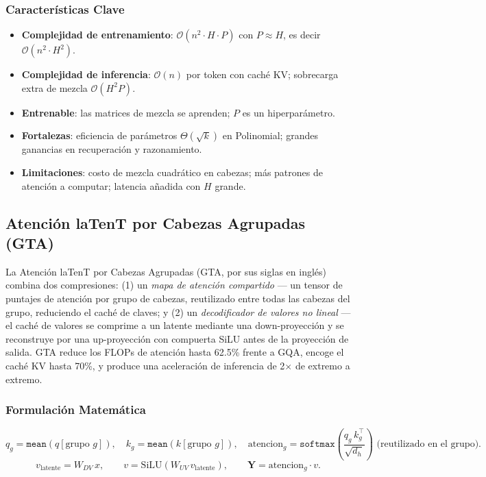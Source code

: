 \subsubsection{Características Clave}
\begin{itemize}[leftmargin=*]
    \item \textbf{Complejidad de entrenamiento}: $\mathcal{O}(n^2 \cdot H \cdot P)$ con $P \approx H$, es decir $\mathcal{O}(n^2 \cdot H^2)$.
    \item \textbf{Complejidad de inferencia}: $\mathcal{O}(n)$ por token con caché KV; sobrecarga extra de mezcla $\mathcal{O}(H^2 P)$.
    \item \textbf{Entrenable}: las matrices de mezcla se aprenden; $P$ es un hiperparámetro.
    \item \textbf{Fortalezas}: eficiencia de parámetros $\Theta(\sqrt{k})$ en Polinomial; grandes ganancias en recuperación y razonamiento.
    \item \textbf{Limitaciones}: costo de mezcla cuadrático en cabezas; más patrones de atención a computar; latencia añadida con $H$ grande.
\end{itemize}

\subsection{Atención laTenT por Cabezas Agrupadas (GTA)}
La Atención laTenT por Cabezas Agrupadas (GTA, por sus siglas en inglés) \citep{sun_gta_2025} combina dos compresiones: (1) un \emph{mapa de atención compartido} --- un tensor de puntajes de atención por grupo de cabezas, reutilizado entre todas las cabezas del grupo, reduciendo el caché de claves; y (2) un \emph{decodificador de valores no lineal} --- el caché de valores se comprime a un latente mediante una down-proyección y se reconstruye por una up-proyección con compuerta SiLU antes de la proyección de salida. GTA reduce los FLOPs de atención hasta 62.5\% frente a GQA, encoge el caché KV hasta 70\%, y produce una aceleración de inferencia de 2$\times$ de extremo a extremo.

\subsubsection{Formulación Matemática}
\[
q_g = \texttt{mean}(q[\text{grupo } g]), \quad k_g = \texttt{mean}(k[\text{grupo } g]), \quad
\text{atencion}_g = \texttt{softmax}\!\left(\frac{q_g\, k_g^\top}{\sqrt{d_h}}\right) \text{ (reutilizado en el grupo)}.
\]
\[
v_{\text{latente}} = W_{DV}\, x, \qquad v = \text{SiLU}(W_{UV}\, v_{\text{latente}}), \qquad
\mathbf{Y} = \text{atencion}_g \cdot v.
\]

